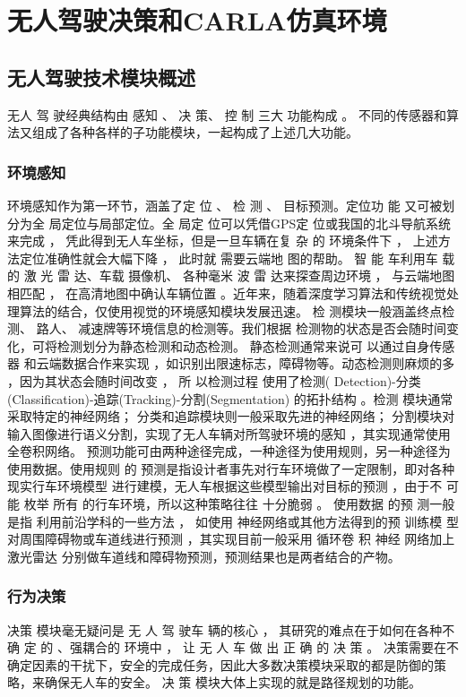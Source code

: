 \section{无人驾驶决策和CARLA仿真环境}

\subsection{无人驾驶技术模块概述}
无人 驾 驶经典结构由 感知 、 决 策、
控 制 三大 功能构成  。 不同的传感器和算法又组成了各种各样的子功能模块，一起构成了上述几大功能。

\subsubsection{环境感知}
环境感知作为第一环节，涵盖了定 位 、 检 测 、 目标预测。定位功 能 又可被划分为全 局定位与局部定位。全 局定 位可以凭借GPS定 位或我国的北斗导航系统来完成 ， 凭此得到无人车坐标，但是一旦车辆在复 杂 的 环境条件下 
 ， 上述方法定位准确性就会大幅下降 ， 此时就 需要云端地 图的帮助。 智 能 车利用车 载 的 激 光 雷 达、车载 摄像机、
 各种毫米 波 雷 达来探查周边环境 ， 与云端地图相匹配 ， 在高清地图中确认车辆位置
 。近年来，随着深度学习算法和传统视觉处理算法的结合，仅使用视觉的环境感知模块发展迅速。
 检 测模块一般涵盖终点检测、 路人、  减速牌等环境信息的检测等。我们根据 检测物的状态是否会随时间变化，可将检测划分为静态检测和动态检测。 静态检测通常来说可
以通过自身传感器 和云端数据合作来实现 ，如识别出限速标志，障碍物等。动态检测则麻烦的多 ，因为其状态会随时间改变 ， 所 以检测过程
使用了检测( Detection)-分类(Classification)-追踪(Tracking)-分割(Segmentation) 的拓扑结构 。检测 模块通常采取特定的神经网络；
 分类和追踪模块则一般采取先进的神经网络； 分割模块对输入图像进行语义分割，实现了无人车辆对所驾驶环境的感知
 ，其实现通常使用全卷积网络。
  预测功能可由两种途径完成，一种途径为使用规则，另一种途径为使用数据。使用规则 的 预测是指设计者事先对行车环境做了一定限制，即对各种现实行车环境模型
  进行建模，无人车根据这些模型输出对目标的预测
  ，由于不 可 能 枚举 所有 的行车环境，所以这种策略往往 十分脆弱 。 使用数据 的预 测一般是指
   利用前沿学科的一些方法 
  ， 如使用 神经网络或其他方法得到的预 训练模 型 对周围障碍物或车道线进行预测 ，其实现目前一般采用 循环卷 积 神经 网络加上激光雷达
  分别做车道线和障碍物预测，预测结果也是两者结合的产物。
\subsubsection{行为决策}
决策 模块毫无疑问是 无 人 驾 驶车 辆的核心 ， 其研究的难点在于如何在各种不确 定 的  、强耦合的 环境中 ， 让 无 人
车 做 出 正 确 的 决 策  。 决策需要在不确定因素的干扰下，安全的完成任务，因此大多数决策模块采取的都是防御的策略，来确保无人车的安全。
决 策 模块大体上实现的就是路径规划的功能。

